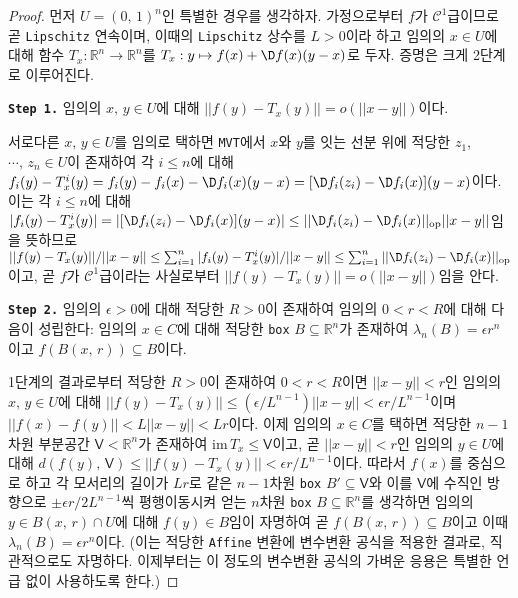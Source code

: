 \begin{proof}
    먼저 $U=(0,\,1)^n$인 특별한 경우를 생각하자. 가정으로부터 $f$가 $\mathcal{C}^1$급이므로 곧 \texttt{Lipschitz} 연속이며, 이때의 \texttt{Lipschitz} 상수를 $L>0$이라 하고 임의의 $x\in U$에 대해 함수 $T_x:\mathbb{R}^n\to\mathbb{R}^n$를 $T_x:y\mapsto f(x)+\D f(x)(y-x)$로 두자. 증명은 크게 2단계로 이루어진다.

    \noindent\textbf{\texttt{Step 1.}} 임의의 $x,\,y\in U$에 대해 $||f(y)-T_x(y)||=o(||x-y||)$이다.

    서로다른 $x,\,y\in U$를 임의로 택하면 \texttt{MVT}에서 $x$와 $y$를 잇는 선분 위에 적당한 $z_1$, $\cdots,\,z_n\in U$이 존재하여 각 $i\leq n$에 대해 $f_i(y)-T_x^i(y)=f_i(y)-f_i(x)-\D f_i(x)(y-x)=[\D f_i(z_i)-\D f_i(x)](y-x)$이다. 이는 각 $i\leq n$에 대해 $|f_i(y)-T_x^i(y)|=|[\D f_i(z_i)-\D f_i(x)](y-x)|\leq||\D f_i(z_i)-\D f_i(x)||_\mathrm{op}||x-y||$임을 뜻하므로 $||f(y)-T_x(y)||/||x-y||\leq\sum_{i=1}^n|f_i(y)-T_x^i(y)|/||x-y||\leq\sum_{i=1}^n||\D f_i(z_i)-\D f_i(x)||_\mathrm{op}$이고, 곧 $f$가 $\mathcal{C}^1$급이라는 사실로부터 $||f(y)-T_x(y)||=o(||x-y||)$임을 안다.

    \noindent\textbf{\texttt{Step 2.}} 임의의 $\epsilon>0$에 대해 적당한 $R>0$이 존재하여 임의의 $0<r<R$에 대해 다음이 성립한다: 임의의 $x\in C$에 대해 적당한 \texttt{box} $B\subseteq\mathbb{R}^n$가 존재하여 $\lambda_n(B)=\epsilon r^n$이고 $f(B(x,\,r))\subseteq B$이다.

    1단계의 결과로부터 적당한 $R>0$이 존재하여 $0<r<R$이면 $||x-y||<r$인 임의의 $x,\,y\in U$에 대해 $||f(y)-T_x(y)||\leq(\epsilon/L^{n-1})||x-y||<\epsilon r/L^{n-1}$이며 $||f(x)-f(y)||<L||x-y||<Lr$이다. 이제 임의의 $x\in C$를 택하면 적당한 $n-1$차원 부분공간 $\mathsf{V}<\mathbb{R}^n$가 존재하여 $\mathrm{im}\,T_x\leq\mathsf{V}$이고, 곧 $||x-y||<r$인 임의의 $y\in U$에 대해 $d(f(y),\,\mathsf{V})\leq||f(y)-T_x(y)||<\epsilon r/L^{n-1}$이다. 따라서 $f(x)$를 중심으로 하고 각 모서리의 길이가 $Lr$로 같은 $n-1$차원 \texttt{box} $B'\subseteq\mathsf{V}$와 이를 $\mathsf{V}$에 수직인 방향으로 $\pm\epsilon r/2L^{n-1}$씩 평행이동시켜 얻는 $n$차원 \texttt{box} $B\subseteq\mathbb{R}^n$를 생각하면 임의의 $y\in B(x,\,r)\cap U$에 대해 $f(y)\in B$임이 자명하여 곧 $f(B(x,\,r))\subseteq B$이고 이때 $\lambda_n(B)=\epsilon r^n$이다. (이는 적당한 \texttt{Affine} 변환에 변수변환 공식을 적용한 결과로, 직관적으로도 자명하다. 이제부터는 이 정도의 변수변환 공식의 가벼운 응용은 특별한 언급 없이 사용하도록 한다.)


\end{proof}

